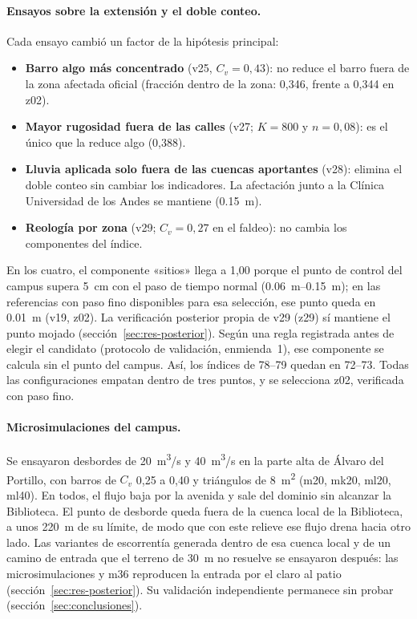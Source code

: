 \paragraph{Ensayos sobre la extensión y el doble conteo.} Cada ensayo cambió un factor de la hipótesis principal:
\begin{itemize}
\item \textbf{Barro algo más concentrado} (v25, $C_v=0{,}43$): no reduce el barro fuera de la zona afectada oficial (fracción dentro de la zona: 0,346, frente a 0,344 en z02).
\item \textbf{Mayor rugosidad fuera de las calles} (v27; $K=800$ y $n=0{,}08$): es el único que la reduce algo (0,388).
\item \textbf{Lluvia aplicada solo fuera de las cuencas aportantes} (v28): elimina el doble conteo sin cambiar los indicadores. La afectación junto a la Clínica Universidad de los Andes se mantiene (\SI{0,15}{m}).
\item \textbf{Reología por zona} (v29; $C_v=0{,}27$ en el faldeo): no cambia los componentes del índice.
\end{itemize}
En los cuatro, el componente «sitios» llega a 1,00 porque el punto de control del campus supera \SI{5}{cm} con el paso de tiempo normal (\SIrange{0,06}{0,15}{m}); en las referencias con paso fino disponibles para esa selección, ese punto queda en \SI{0,01}{m} (v19, z02). La verificación posterior propia de v29 (z29) sí mantiene el punto mojado (sección~\ref{sec:res-posterior}). Según una regla registrada antes de elegir el candidato (protocolo de validación, enmienda~1), ese componente se calcula sin el punto del campus. Así, los índices de 78--79 quedan en 72--73. Todas las configuraciones empatan dentro de tres puntos, y se selecciona z02, verificada con paso fino.

\paragraph{Microsimulaciones del campus.} Se ensayaron desbordes de \SI{20}{m^3/s} y \SI{40}{m^3/s} en la parte alta de Álvaro del Portillo, con barros de $C_v$ 0,25 a 0,40 y triángulos de \SI{8}{m^2} (m20, mk20, ml20, ml40). En todos, el flujo baja por la avenida y sale del dominio sin alcanzar la Biblioteca. El punto de desborde queda fuera de la cuenca local de la Biblioteca, a unos \SI{220}{m} de su límite, de modo que con este relieve ese flujo drena hacia otro lado. Las variantes de escorrentía generada dentro de esa cuenca local y de un camino de entrada que el terreno de \SI{30}{m} no resuelve se ensayaron después: las microsimulaciones y m36 reproducen la entrada por el claro al patio (sección~\ref{sec:res-posterior}). Su validación independiente permanece sin probar (sección~\ref{sec:conclusiones}).

